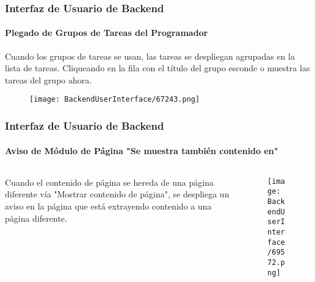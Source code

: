 \begin{frame}[fragile]
	\frametitle{Interfaz de Usuario de Backend}
	\framesubtitle{Plegado de Grupos de Tareas del Programador}

	Cuando los grupos de tareas se usan, las tareas se despliegan agrupadas en la lista de tareas.
	Cliqueando en la fila con el título del grupo esconde o muestra las tareas del grupo ahora.

	\begin{figure}\vspace{-0.3cm}
		\texttt{[image: BackendUserInterface/67243.png]}
	\end{figure}

\end{frame}

\begin{frame}[fragile]
	\frametitle{Interfaz de Usuario de Backend}
	\framesubtitle{Aviso de Módulo de Página "Se muestra también contenido en"}

	\begin{columns}[T]
		\begin{column}{.3\textwidth}
			Cuando el contenido de página se hereda de una página diferente vía "Mostrar contenido de página",
			se despliega un aviso en la página que está extrayendo contenido a una página diferente.
		\end{column}

		\begin{column}{.7\textwidth}
			\begin{figure}\vspace*{-0.6cm}
				\texttt{[image: BackendUserInterface/69572.png]}
			\end{figure}
		\end{column}
	\end{columns}

\end{frame}

